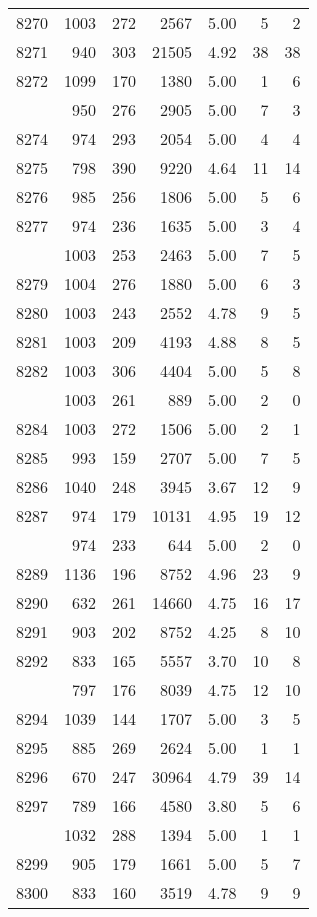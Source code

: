 \documentclass[
]{article}
\begin{document}
\begin{table}
\begin{tabular}[t]{lrrrrrr}
8270 & 1003 & 272 & 2567 & 5.00 & 5 & 2\\
8271 & 940 & 303 & 21505 & 4.92 & 38 & 38\\
8272 & 1099 & 170 & 1380 & 5.00 & 1 & 6\\
\addlinespace
8273 & 950 & 276 & 2905 & 5.00 & 7 & 3\\
8274 & 974 & 293 & 2054 & 5.00 & 4 & 4\\
8275 & 798 & 390 & 9220 & 4.64 & 11 & 14\\
8276 & 985 & 256 & 1806 & 5.00 & 5 & 6\\
8277 & 974 & 236 & 1635 & 5.00 & 3 & 4\\
\addlinespace
8278 & 1003 & 253 & 2463 & 5.00 & 7 & 5\\
8279 & 1004 & 276 & 1880 & 5.00 & 6 & 3\\
8280 & 1003 & 243 & 2552 & 4.78 & 9 & 5\\
8281 & 1003 & 209 & 4193 & 4.88 & 8 & 5\\
8282 & 1003 & 306 & 4404 & 5.00 & 5 & 8\\
\addlinespace
8283 & 1003 & 261 & 889 & 5.00 & 2 & 0\\
8284 & 1003 & 272 & 1506 & 5.00 & 2 & 1\\
8285 & 993 & 159 & 2707 & 5.00 & 7 & 5\\
8286 & 1040 & 248 & 3945 & 3.67 & 12 & 9\\
8287 & 974 & 179 & 10131 & 4.95 & 19 & 12\\
\addlinespace
8288 & 974 & 233 & 644 & 5.00 & 2 & 0\\
8289 & 1136 & 196 & 8752 & 4.96 & 23 & 9\\
8290 & 632 & 261 & 14660 & 4.75 & 16 & 17\\
8291 & 903 & 202 & 8752 & 4.25 & 8 & 10\\
8292 & 833 & 165 & 5557 & 3.70 & 10 & 8\\
\addlinespace
8293 & 797 & 176 & 8039 & 4.75 & 12 & 10\\
8294 & 1039 & 144 & 1707 & 5.00 & 3 & 5\\
8295 & 885 & 269 & 2624 & 5.00 & 1 & 1\\
8296 & 670 & 247 & 30964 & 4.79 & 39 & 14\\
8297 & 789 & 166 & 4580 & 3.80 & 5 & 6\\
\addlinespace
8298 & 1032 & 288 & 1394 & 5.00 & 1 & 1\\
8299 & 905 & 179 & 1661 & 5.00 & 5 & 7\\
8300 & 833 & 160 & 3519 & 4.78 & 9 & 9\\

\end{tabular}
\end{table}
\end{document}
